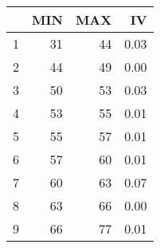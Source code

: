 \begin{table}[ht]
\centering
\begin{tabular}{rrrr}
  \hline
 & MIN & MAX & IV \\ 
  \hline
1 &  31 &  44 & 0.03 \\ 
  2 &  44 &  49 & 0.00 \\ 
  3 &  50 &  53 & 0.03 \\ 
  4 &  53 &  55 & 0.01 \\ 
  5 &  55 &  57 & 0.01 \\ 
  6 &  57 &  60 & 0.01 \\ 
  7 &  60 &  63 & 0.07 \\ 
  8 &  63 &  66 & 0.00 \\ 
  9 &  66 &  77 & 0.01 \\ 
   \hline
\end{tabular}
\end{table}
